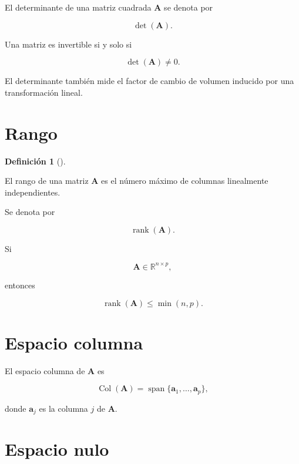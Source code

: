 \documentclass[
  spanish,
  10.5pt,
  letterpaper,
  DIV=11,
  numbers=noendperiod,
  oneside,
  open=any]{scrreprt}
\theoremstyle{definition}
\newtheorem{definition}{Definición}[chapter]
\theoremstyle{definition}
\theoremstyle{plain}
\theoremstyle{remark}
\begin{document}

El determinante de una matriz cuadrada \(\mathbf{A}\) se denota por

\[
\det(\mathbf{A}).
\]

Una matriz es invertible si y solo si

\[
\det(\mathbf{A})\neq 0.
\]

El determinante también mide el factor de cambio de volumen inducido por
una transformación lineal.

\section*{Rango}\label{rango}


\begin{definition}[]\protect\hypertarget{def-rango}{}\label{def-rango}

El rango de una matriz \(\mathbf{A}\) es el número máximo de columnas
linealmente independientes.

\end{definition}

Se denota por

\[
\operatorname{rank}(\mathbf{A}).
\]

Si

\[
\mathbf{A}\in\mathbb{R}^{n\times p},
\]

entonces

\[
\operatorname{rank}(\mathbf{A})
\leq
\min(n,p).
\]

\section*{Espacio columna}\label{espacio-columna}


El espacio columna de \(\mathbf{A}\) es

\[
\operatorname{Col}(\mathbf{A})
=
\operatorname{span}
\{\mathbf{a}_1,\ldots,\mathbf{a}_p\},
\]

donde \(\mathbf{a}_j\) es la columna \(j\) de \(\mathbf{A}\).

\section*{Espacio nulo}\label{espacio-nulo}
\end{document}
